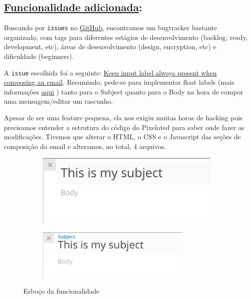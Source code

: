 \subsection*{\underline{Funcionalidade adicionada}:}

Buscando por \texttt{issues} no
\href{https://github.com/pixelated-project/pixelated-user-agent/issues/}
{GitHub}, encontramos um bugtracker bastante organizado, com tags para
diferentes estágios de desenvolvimento (backlog, ready, development, etc),
áreas de desenvolvimento (design, encryption, etc) e dificuldade (beginners).

A \texttt{issue} escolhida foi a seguinte:
\href{https://github.com/pixelated-project/pixelated-user-agent/issues/384}
{Keep input label always present when composing an email}. Resumindo, pede-se
para implementar float labels (mais informações
\href{http://bradfrost.com/blog/post/float-label-pattern}{aqui} ) tanto para o
Subject quanto para o Body na hora de compor uma mensagem/editar um rascunho.

Apesar de ser uma feature pequena, ela nos exigiu muitas horas de hacking pois
precisamos entender a estrutura do código do Pixelated para saber onde fazer as
modificações. Tivemos que alterar o HTML, o CSS e o Javascript das seções de
composição do email e alteramos, no total, 4 arquivos.

\begin{figure}[h]
\centering
\begin{subfigure}{.5\textwidth}
  \centering
  \includegraphics[width=.75\linewidth]{src/issue1.png}
\end{subfigure}%
\begin{subfigure}{.5\textwidth}
  \centering
  \includegraphics[width=.9\linewidth]{src/issue2.png}
\end{subfigure}
\caption*{Esboço da funcionalidade}
\end{figure}

